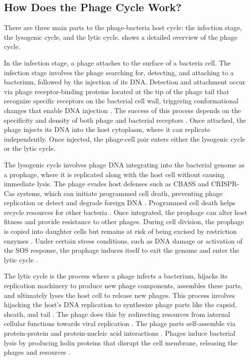 \subsection{How Does the Phage Cycle Work?}
There are three main parts to the phage-bacteria host cycle: the infection stage, the lysogenic cycle, and the lytic cycle. 
 shows a detailed overview of the phage cycle. 

In the infection stage, a phage attaches to the surface of a bacteria cell. 
The infection stage involves the phage searching for, detecting, and attaching to a bacterium, followed by the injection of its DNA. 
Detection and attachment occur via phage receptor-binding proteins located at the tip of the phage tail that recognize specific receptors on the bacterial cell wall, triggering conformational changes that enable DNA injection \cite{lindbergBacteriophageReceptors1973}. 
The success of this process depends on the specificity and density of both phage and bacterial receptors \cite{stoneUnderstandingExploitingPhage2019}. 
Once attached, the phage injects its DNA into the host cytoplasm, where it can replicate independently.
Once injected, the phage-cell pair enters either the lysogenic cycle or the lytic cycle. 

The lysogenic cycle involves phage DNA integrating into the bacterial genome as a prophage, where it is replicated along with the host cell without causing immediate lysis.
The phage evades host defenses such as CBASS and CRISPR-Cas systems, which can initiate programmed cell death, preventing phage replication or detect and degrade foreign DNA \cite{banhBacterialCGASSenses2023, levyCRISPRAdaptationBiases2015}. 
Programmed cell death helps recycle resources for other bacteria \cite{warwick-dugdaleHosthijackingPlanktonicPiracy2019}. 
Once integrated, the prophage can alter host fitness and provide resistance to other phages. 
During cell division, the prophage is copied into daughter cells but remains at risk of being excised by restriction enzymes \cite{sharpMolecularEvolutionBacteriophages1986}.
Under certain stress conditions, such as DNA damage or activation of the SOS response, the prophage induces itself to exit the genome and enter the lytic cycle \cite{waldorPhageRegulatoryCircuits2005, stoneUnderstandingExploitingPhage2019, fortierImportanceProphagesEvolution2013}.

The lytic cycle is the process where a phage infects a bacterium, hijacks its replication machinery to produce new phage components, assembles these parts, and ultimately lyses the host cell to release new phages. 
This process involves hijacking the host's DNA replication to synthesize phage parts like the capsid, sheath, and tail . 
The phage does this by redirecting resources from internal cellular functions towards viral replication \cite{warwick-dugdaleHosthijackingPlanktonicPiracy2019}. 
The phage parts self-assemble via protein-protein and protein-nucleic acid interactions \cite{aksyukBacteriophageAssembly2011}. 
Phages induce bacterial lysis by producing holin proteins that disrupt the cell membrane, releasing the phages and resources \cite{wangHolinsProteinClocks2000}.

